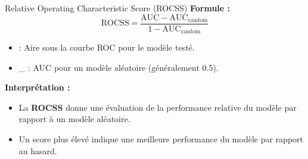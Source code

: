 \begin{frame}{Relative Operating Characteristic Score (ROCSS)}
  \textbf{Formule :}
  \[
  \text{ROCSS} = \frac{\text{AUC} - \text{AUC}_\text{random}}{1 - \text{AUC}_\text{random}}
  \]
  \begin{itemize}
  \item {} : Aire sous la courbe ROC pour le modèle testé.
  \item {}\_ : AUC pour un modèle aléatoire (généralement 0.5).
  \end{itemize}
  
  \textbf{Interprétation :}
  \begin{itemize}
      \item La \textbf{ROCSS} donne une évaluation de la performance relative du modèle par rapport à un modèle aléatoire.
      \item Un score plus élevé indique une meilleure performance du modèle par rapport au hasard.
  \end{itemize}
\end{frame}